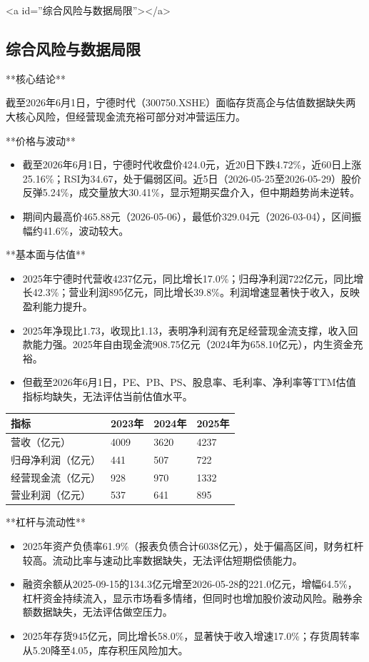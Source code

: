 \documentclass[12pt,a4paper]{article}
\begin{document}
<a id=''综合风险与数据局限''></a>

\subsection{ 综合风险与数据局限}

**核心结论**

截至2026年6月1日，宁德时代（300750.XSHE）面临存货高企与估值数据缺失两大核心风险，但经营现金流充裕可部分对冲营运压力。

**价格与波动**
\begin{itemize}
\item 截至2026年6月1日，宁德时代收盘价424.0元，近20日下跌4.72\%，近60日上涨25.16\%；RSI为34.67，处于偏弱区间。近5日（2026-05-25至2026-05-29）股价反弹5.24\%，成交量放大30.41\%，显示短期买盘介入，但中期趋势尚未逆转。
\item 期间内最高价465.88元（2026-05-06），最低价329.04元（2026-03-04），区间振幅约41.6\%，波动较大。
\end{itemize}

**基本面与估值**
\begin{itemize}
\item 2025年宁德时代营收4237亿元，同比增长17.0\%；归母净利润722亿元，同比增长42.3\%；营业利润895亿元，同比增长39.8\%。利润增速显著快于收入，反映盈利能力提升。
\item 2025年净现比1.73，收现比1.13，表明净利润有充足经营现金流支撑，收入回款能力强。2025年自由现金流908.75亿元（2024年为658.10亿元），内生资金充裕。
\item 但截至2026年6月1日，PE、PB、PS、股息率、毛利率、净利率等TTM估值指标均缺失，无法评估当前估值水平。
\end{itemize}

\begin{table}[htbp]
\centering
\begin{tabular}{llll}
\toprule
指标 & 2023年 & 2024年 & 2025年 \\
\midrule
营收（亿元） & 4009 & 3620 & 4237 \\
归母净利润（亿元） & 441 & 507 & 722 \\
经营现金流（亿元） & 928 & 970 & 1332 \\
营业利润（亿元） & 537 & 641 & 895 \\
\bottomrule
\end{tabular}
\end{table}


**杠杆与流动性**
\begin{itemize}
\item 2025年资产负债率61.9\%（报表负债合计6038亿元），处于偏高区间，财务杠杆较高。流动比率与速动比率数据缺失，无法评估短期偿债能力。
\item 融资余额从2025-09-15的134.3亿元增至2026-05-28的221.0亿元，增幅64.5\%，杠杆资金持续流入，显示市场看多情绪，但同时也增加股价波动风险。融券余额数据缺失，无法评估做空压力。
\item 2025年存货945亿元，同比增长58.0\%，显著快于收入增速17.0\%；存货周转率从5.20降至4.05，库存积压风险加大。
\end{itemize}
\end{document}
